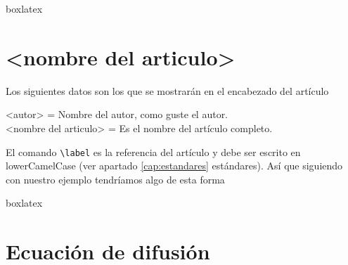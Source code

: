 {\begin{tcblisting}{boxlatex}
{		\chapter{<nombre del articulo>}\label{art:<nombre upperCamelCase>}
	}\cleanalldata
	\end{tcblisting}
	Los siguientes datos son los que se mostrarán en el encabezado del artículo
	\begin{center}
		<autor>  = Nombre del autor, como guste el autor.\\  
		<nombre del articulo> = Es el nombre del artículo completo.\\
	\end{center}
	El comando \verb|\label| es la referencia del artículo y debe ser escrito en lowerCamelCase (ver apartado \ref{cap:estandares} estándares).\pap
	Así que siguiendo con nuestro ejemplo tendríamos algo de esta forma
	\begin{tcblisting}{boxlatex}
		{\justifying
			\chapter{Ecuación de difusión}\label{art:ecuacionDeDifusion}
		}\cleanalldata
	\end{tcblisting}
}
